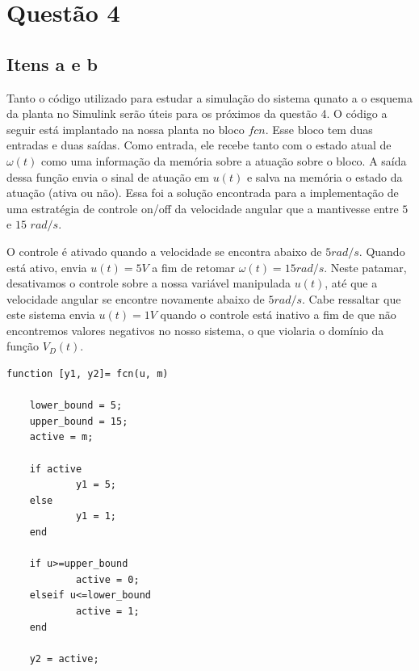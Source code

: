 \documentclass[11pt]{article}
\begin{document}
\section{Questão 4}
\subsection{Itens a e b}
Tanto o código utilizado para estudar a simulação do sistema qunato a o esquema da planta no Simulink serão
úteis para os próximos da questão 4. O código a seguir está implantado na nossa planta no bloco $fcn$. Esse bloco
tem duas entradas e duas saídas. Como entrada, ele recebe tanto com o estado atual de $\omega(t)$
como uma informação da memória sobre a atuação sobre o bloco. A saída dessa função envia o sinal de atuação em $u(t)$
e salva na memória o estado da atuação (ativa ou não). Essa foi a solução encontrada para a implementação de uma
estratégia de controle on/off da velocidade angular que a mantivesse entre $5$ e $15$ $rad/s$.

O controle é ativado quando a velocidade se encontra abaixo de $5 rad/s$. Quando está ativo, envia $u(t) = 5V$
a fim de retomar $\omega(t) = 15 rad/s$. Neste patamar, desativamos o controle sobre a nossa variável manipulada
$u(t)$, até que a velocidade angular se encontre novamente abaixo de $5 rad/s$.
Cabe ressaltar que este sistema envia $u(t) = 1V$ quando o controle está inativo a fim de que não encontremos valores
negativos no nosso sistema, o que violaria o domínio da função $V_D(t)$.

\begin{lstlisting}[caption={Código usado para controlar a planta},captionpos=b]
function [y1, y2]= fcn(u, m)

	lower_bound = 5;
	upper_bound = 15;
	active = m;

	if active
			y1 = 5;
	else
			y1 = 1;
	end

	if u>=upper_bound
			active = 0;
	elseif u<=lower_bound
			active = 1;
	end

	y2 = active;
\end{lstlisting}
\end{document}
